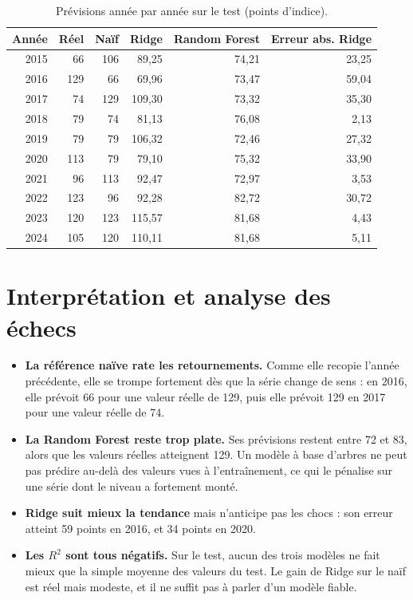 \documentclass[11pt,a4paper]{article}
\begin{document}
\begin{table}[H]
\centering
\caption{Prévisions année par année sur le test (points d'indice).}
\begin{tabular}{rrrrrr}
\toprule
Année & Réel & Naïf & Ridge & Random Forest & Erreur abs. Ridge \\
\midrule
2015 & 66 & 106 & 89,25 & 74,21 & 23,25 \\
2016 & 129 & 66 & 69,96 & 73,47 & 59,04 \\
2017 & 74 & 129 & 109,30 & 73,32 & 35,30 \\
2018 & 79 & 74 & 81,13 & 76,08 & 2,13 \\
2019 & 79 & 79 & 106,32 & 72,46 & 27,32 \\
2020 & 113 & 79 & 79,10 & 75,32 & 33,90 \\
2021 & 96 & 113 & 92,47 & 72,97 & 3,53 \\
2022 & 123 & 96 & 92,28 & 82,72 & 30,72 \\
2023 & 120 & 123 & 115,57 & 81,68 & 4,43 \\
2024 & 105 & 120 & 110,11 & 81,68 & 5,11 \\
\bottomrule
\end{tabular}
\end{table}

\section{Interprétation et analyse des échecs}

\begin{itemize}
  \item \textbf{La référence naïve rate les retournements.} Comme elle recopie l'année précédente, elle se trompe fortement dès que la série change de sens : en 2016, elle prévoit 66 pour une valeur réelle de 129, puis elle prévoit 129 en 2017 pour une valeur réelle de 74.
  \item \textbf{La Random Forest reste trop plate.} Ses prévisions restent entre 72 et 83, alors que les valeurs réelles atteignent 129. Un modèle à base d'arbres ne peut pas prédire au-delà des valeurs vues à l'entraînement, ce qui le pénalise sur une série dont le niveau a fortement monté.
  \item \textbf{Ridge suit mieux la tendance} mais n'anticipe pas les chocs : son erreur atteint 59 points en 2016, et 34 points en 2020.
  \item \textbf{Les $R^2$ sont tous négatifs.} Sur le test, aucun des trois modèles ne fait mieux que la simple moyenne des valeurs du test. Le gain de Ridge sur le naïf est réel mais modeste, et il ne suffit pas à parler d'un modèle fiable.
\end{itemize}
\end{document}
